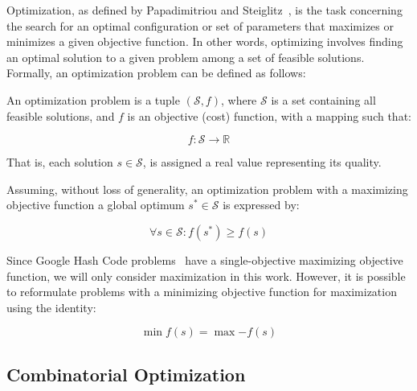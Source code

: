Optimization, as defined by Papadimitriou and
Steiglitz~\cite{papadimitriou1998combinatorial}, is the task concerning the
search for an optimal configuration or set of parameters that maximizes or
minimizes a given objective function. In other words, optimizing involves
finding an optimal solution to a given problem among a set of feasible
solutions. Formally, an optimization problem can be defined as follows:

\begin{definition}
  \label{def:optimization-problem}
  An optimization problem is a tuple $(\mathcal{S}, f)$, where
  $\mathcal{S}$ is a set containing all feasible solutions, and $f$ is an
  objective (cost) function, with a mapping such that:

  \begin{equation}
    \label{eq:optimization-problem}
    f \colon \mathcal{S} \longrightarrow \mathbb{R}
  \end{equation}

  That is, each solution $s \in \mathcal{S}$, is assigned a real value
  representing its quality.
\end{definition}

\begin{definition}
  \label{def:global-optimum}
  Assuming, without loss of generality, an optimization problem with a maximizing
  objective function a global optimum $s^* \in \mathcal{S}$ is expressed by:

  \begin{equation}
    \forall s \in \mathcal{S} \colon f(s^{*}) \geq f(s)
  \end{equation}

\end{definition}

Since Google Hash Code problems~\cite{googlellc2023codingcompetitionsarchive}
have a single-objective maximizing objective function, we will only consider
maximization in this work. However, it is possible to reformulate problems with
a minimizing objective function for maximization~\cite{nocedal2006numerical}
using the identity:

\begin{equation}
  \label{eq:max2min}
  \min{f(s)} = \max{-f(s)}
\end{equation}

\subsection{Combinatorial Optimization}
\label{subsec:combinatorial-optimization}

